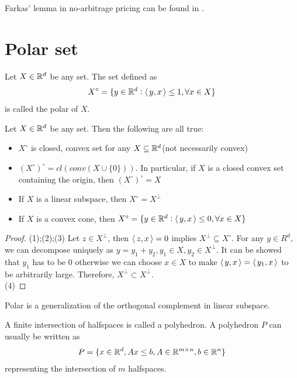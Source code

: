 \begin{refsection}
\begin{remark}
Farkas' lemma in no-arbitrage pricing can be found in \cite[168]{bertsimas1997introduction}.
\end{remark}


\section{Polar set}
\begin{definition}[Polar]
Let $X\in \mathbb{R}^d$ be any set. The set defined as
$$X^\circ = \{y\in \mathbb{R}^d: {\left< \, y,x \, \right>}\leq 1,\forall x\in X\}$$
is called the polar of $X$.
\end{definition}

\begin{theorem}
	Let $X\in \mathbb{R}^d$ be any set. Then the following are all true:
	\begin{itemize}
		\item $X^\circ$ is closed, convex set for any $X\subseteq \mathbb{R}^d$(not necessarily convex)
		\item $(X^\circ)^\circ = cl(conv(X\cup \{0\}))$. In particular, if $X$ is a closed convex set containing the origin, then $(X^\circ)^\circ = X$
		\item If $X$ is a linear subspace, then $X^\circ = X^\perp$
		\item If $X$ is a convex cone, then $X^\circ = \{y\in \mathbb{R}^d: {\left< \, y,x \, \right>}\leq 0, \forall x\in X\}$
	\end{itemize}
\end{theorem}
\begin{proof}
	(1);(2);(3) Let $z\in X^\perp$, then ${\left< \, z,x \, \right>} = 0$ implies $X^\perp \subseteq X^\circ$. For any $y\in R^d$, we can decompose uniquely as $y = y_1 + y_2,y_1\in X,y_2\in X^\perp$. It can be showed that $y_1$ has to be 0 otherwise we can choose $x\in X$ to make ${\left< \, y,x \, \right>} = {\left< \, y_1,x \, \right>}$ to be arbitrarily large. Therefore, $X^\perp \subset X^\perp$. \\
	(4)
\end{proof}

\begin{remark}
	Polar is a generalization of the orthogonal complement in linear subspace.
\end{remark}


\begin{definition}[polyhedron]
	A finite intersection of halfspaces is called a polyhedron. A polyhedron $P$ can usually be written as
	$$P=\{x\in \mathbb{R}^d, Ax \leq b, A\in \mathbb{R}^{m\times n},b\in \mathbb{R}^n\}$$
	representing the intersection of $m$ halfspaces.
\end{definition}


\end{refsection}
